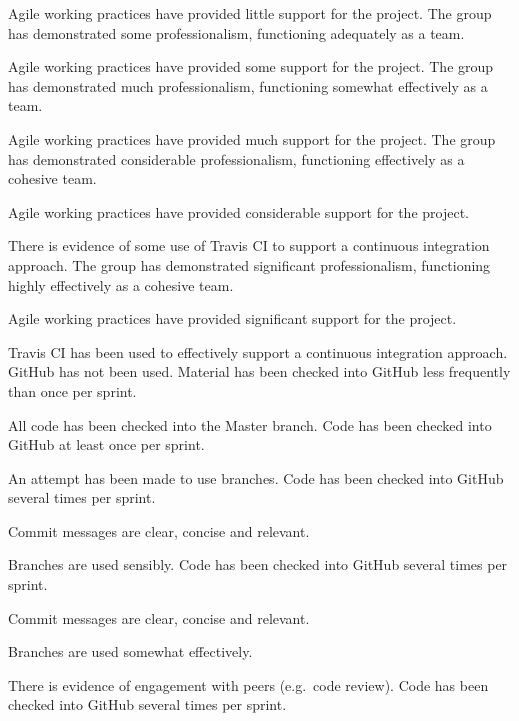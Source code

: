 \documentclass{../fal_assignment}
\begin{document}
\begin{markingrubric}
            \par Agile working practices have provided little support for the project.
        \grade The group has demonstrated some professionalism,
            functioning adequately as a team.
            \par Agile working practices have provided some support for the project.
        \grade The group has demonstrated much professionalism,
            functioning somewhat effectively as a team.
            \par Agile working practices have provided much support for the project.
        \grade The group has demonstrated considerable professionalism,
            functioning effectively as a cohesive team.
            \par Agile working practices have provided considerable support for the project.
            \par There is evidence of some use of Travis CI to support a continuous integration approach.
        \grade The group has demonstrated significant professionalism,
            functioning highly effectively as a cohesive team.
            \par Agile working practices have provided significant support for the project.
            \par Travis CI has been used to effectively support a continuous integration approach.
%
        \grade\fail GitHub has not been used.
        \grade Material has been checked into GitHub less frequently than once per sprint.
            \par All code has been checked into the Master branch.
        \grade Code has been checked into GitHub at least once per sprint.
            \par An attempt has been made to use branches.
        \grade Code has been checked into GitHub several times per sprint.
            \par Commit messages are clear, concise and relevant.
            \par Branches are used sensibly.
        \grade Code has been checked into GitHub several times per sprint.
            \par Commit messages are clear, concise and relevant.
            \par Branches are used somewhat effectively.
            \par There is evidence of engagement with peers (e.g.\ code review).
        \grade Code has been checked into GitHub several times per sprint.

\end{markingrubric}
\end{document}
